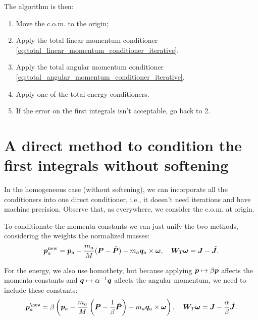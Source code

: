 \documentclass{article}
\begin{document}
The algorithm is then:
\begin{enumerate}
    \item Move the c.o.m. to the origin;
    \item Apply the total linear momentum conditioner \eqref{eq:total_linear_momentum_conditioner_iterative}.
    \item Apply the total angular momentum conditioner \eqref{eq:total_angular_momentum_conditioner_iterative}.
    \item Apply one of the total energy conditioners.
    \item If the error on the first integrals isn't acceptable, go back to 2. 
\end{enumerate}

\section{A direct method to condition the first integrals without softening}
In the homogeneous case (without softening), we can incorporate all the conditioners into one direct conditioner, i.e., it doesn't need iterations and have machine precision. Observe that, as everywhere, we consider the c.o.m. at origin.

To conditionate the momenta constants we can just unify the two methods, considering the weights the normalized masses:
\begin{equation}
\bm p_a^{\text{new}} = \bm p_a - \dfrac{m_a}{M} (\bm P - \tilde{\bm P}) - m_a \bm q_a \times \bm \omega,
\quad
\bm W_T \bm \omega = \bm J - \tilde{\bm J}.
\end{equation}

For the energy, we also use homothety, but because applying $\bm p \mapsto \beta \bm p$ affects the momenta constants and $\bm q \mapsto \alpha^{-1} \bm q$ affects the angular momentum, we need to include these constants:
\begin{equation}
\vet p_a^{\text{\new}} = \beta \left(\vet p_a - \dfrac{m_a}{M} \left(\vet P - \dfrac{1}{\beta} \tilde{\vet P}\right) - m_a \vet q_a \times \vet \omega\right),
\quad
\bm W_T \vet \omega = \vet J - \dfrac{\alpha}{\beta} \tilde{\vet J}.
\end{equation}
\end{document}

